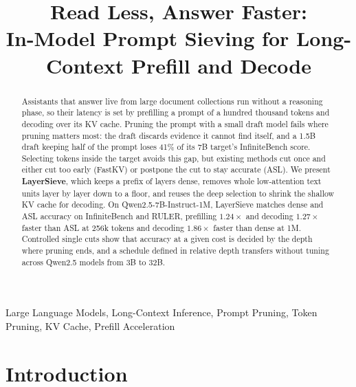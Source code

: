 \documentclass[10pt,conference]{IEEEtran}
\title{Read Less, Answer Faster:\\In-Model Prompt Sieving for Long-Context Prefill and Decode}
\author{\ifanon\IEEEauthorblockN{Anonymous Authors}\else
    \IEEEauthorblockN{Quang Nguyen}
    \IEEEauthorblockA{
        \textit{Posts and Telecommunications Institute of Technology, Ha Noi, Vietnam} \\
        Email: nguyenquang71103@gmail.com
    }
\fi
}
\begin{document}
\maketitle
{}

\begin{abstract}
Assistants that answer live from large document collections run without a reasoning phase, so their latency is set by prefilling a prompt of a hundred thousand tokens and decoding over its KV cache. Pruning the prompt with a small draft model fails where pruning matters most: the draft discards evidence it cannot find itself, and a 1.5B draft keeping half of the prompt loses 41\% of its 7B target's InfiniteBench score. Selecting tokens inside the target avoids this gap, but existing methods cut once and either cut too early (FastKV) or postpone the cut to stay accurate (ASL). We present \textbf{LayerSieve}, which keeps a prefix of layers dense, removes whole low-attention text units layer by layer down to a floor, and reuses the deep selection to shrink the shallow KV cache for decoding. On Qwen2.5-7B-Instruct-1M, LayerSieve matches dense and ASL accuracy on InfiniteBench and RULER, prefilling $1.24\times$ and decoding $1.27\times$ faster than ASL at 256k tokens and decoding $1.86\times$ faster than dense at 1M. Controlled single cuts show that accuracy at a given cost is decided by the depth where pruning ends, and a schedule defined in relative depth transfers without tuning across Qwen2.5 models from 3B to 32B.
\end{abstract}

\begin{IEEEkeywords}
Large Language Models, Long-Context Inference, Prompt Pruning, Token Pruning, KV Cache, Prefill Acceleration
\end{IEEEkeywords}

\section{Introduction}
\label{sec:intro}
\end{document}
